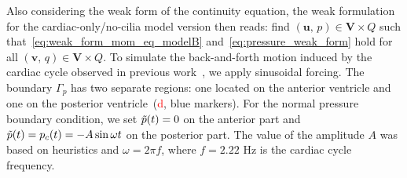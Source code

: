 \documentclass[fleqn]{wlscirep}
\newcommand{\uu}{\mathbf{u}}
\newcommand{\vv}{\mathbf{v}}
\newcommand{\VV}{\mathbf{V}}
\newcommand{\fixme}[1]{\textcolor{red}{#1}}
\begin{document}
Also considering the weak form of the continuity equation,
the weak formulation for the cardiac-only/no-cilia model version
then reads: find $(\uu,\, p)\in\VV\times Q$
such that~\eqref{eq:weak_form_mom_eq_modelB} and~\eqref{eq:pressure_weak_form}
hold for all $(\vv, \, q)\in\VV\times Q$.
To simulate the back-and-forth motion induced by the cardiac cycle observed in
previous work~\cite{Olstad2019CiliaryDevelopment}, we apply sinusoidal forcing.
The boundary $\Gamma_p$ has two separate regions: one located on the
anterior ventricle and one on the posterior ventricle~(\fixme{d}, blue markers).
For the normal pressure boundary condition, we set $\Tilde{p}(t) = 0$ on the anterior part and
$\Tilde{p}(t) = p_c(t) = -A\sin{\omega t}$ on the posterior part. The value of the amplitude
$A$ was based on heuristics and $\omega = 2\pi f$, where $f=2.22$ Hz is the cardiac cycle frequency. 
\end{document}
